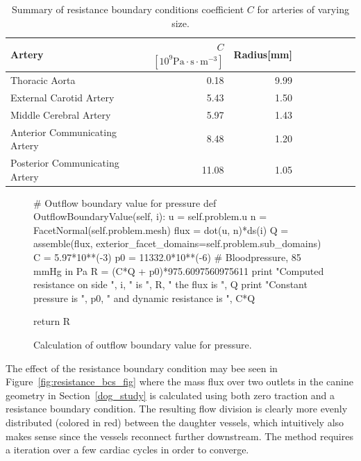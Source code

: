 \begin{table}
  \begin{center}
    \begin{tabular}{l*{7}{r}r}
      Artery & $C$ $ [10^9 \mathrm{Pa} \cdot \mathrm{s}  \cdot \mathrm{m}^{-3}]$ & Radius[mm]\\
      \hline
      Thoracic Aorta			&  0.18 &  	9.99\\
      External Carotid Artery  	& 5.43   &	1.50\\
      Middle Cerebral Artery  	& 5.97   &	1.43\\
      Anterior Communicating Artery  	& 8.48   &	1.20\\
      Posterior Communicating Artery  & 11.08   &	1.05\\
    \end{tabular}
  \end{center}
  \caption{Summary of resistance boundary conditions coefficient $C$
    for arteries of varying size.}
  \label{resistance_coeff}
\end{table}

\begin{figure}
  \codesize
  \begin{center}
    \begin{python}
# Outflow boundary value for pressure
def OutflowBoundaryValue(self, i):
    u = self.problem.u
    n = FacetNormal(self.problem.mesh)
    flux = dot(u, n)*ds(i)
    Q = assemble(flux, exterior_facet_domains=self.problem.sub_domains)
    C = 5.97*10**(-3)
    p0 = 11332.0*10**(-6) # Bloodpressure, 85 mmHg in Pa
    R = (C*Q + p0)*975.6097560975611
    print "Computed resistance on side ", i, " is ", R, " the flux is ", Q
    print "Constant pressure is ", p0, " and dynamic resistance is ", C*Q

    return R

    \end{python}
    \caption{Calculation of outflow boundary value for pressure.}
    \label{fig:resistance_code}
  \end{center}
\end{figure}

The effect of the resistance boundary condition may bee seen in
Figure~\ref{fig:resistance_bcs_fig} where the mass flux over two
outlets in the canine geometry in Section~\ref{dog_study} is
calculated using both zero traction and a resistance boundary
condition. The resulting flow division is clearly more evenly
distributed (colored in red) between the daughter vessels, which
intuitively also makes sense since the vessels reconnect further
downstream. The method requires a iteration over a few cardiac cycles
in order to converge.

